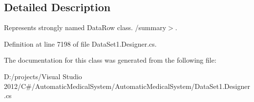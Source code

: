 \subsection{Detailed Description}
Represents strongly named DataRow class. /summary$>$. 

Definition at line 7198 of file DataSet1.Designer.cs.

The documentation for this class was generated from the following file:\begin{CompactItemize}
\item 
D:/projects/Visual Studio 2012/C\#/AutomaticMedicalSystem/AutomaticMedicalSystem/DataSet1.Designer.cs\end{CompactItemize}
